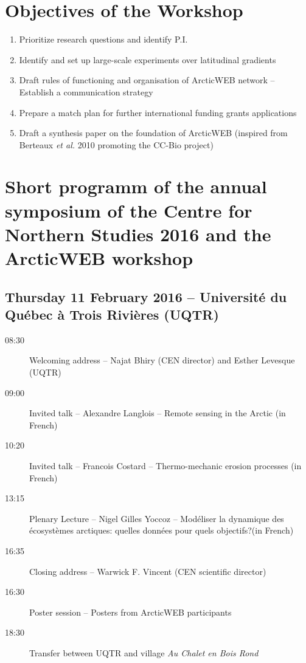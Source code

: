 \documentclass[10pt,letterpaper]{article}
\begin{document}
\section*{Objectives of the Workshop}

\vspace{0.35cm}

\begin{enumerate}
    \item{Prioritize research questions and identify P.I.}
    \item{Identify and set up large-scale experiments over latitudinal gradients}
    \item{Draft rules of functioning and organisation of ArcticWEB network -- Establish a communication strategy}
    \item{Prepare a match plan for further international funding grants applications}
    \item{Draft a synthesis paper on the foundation of ArcticWEB (inspired from Berteaux \textit{et al.} 2010 promoting the CC-Bio project)}
\end{enumerate}

\vspace{0.45cm}

\section*{Short programm of the annual symposium of the Centre for Northern Studies 2016 and the ArcticWEB workshop}

\vspace{0.35cm}

\subsection*{Thursday 11 February 2016 -- Université du Québec à Trois Rivières (UQTR)}

\vspace{0.35cm}

\begin{description}
    \item[08:30] Welcoming address -- Najat Bhiry (CEN director) and Esther Levesque (UQTR)
    \item[09:00] Invited talk -- Alexandre Langlois -- Remote sensing in the Arctic (in French)
    \item[10:20] Invited talk -- Francois Costard -- Thermo-mechanic erosion processes (in French)
    \item[13:15] Plenary Lecture -- Nigel Gilles Yoccoz -- Modéliser la dynamique des écosystèmes arctiques: quelles données pour quels objectifs?(in French)
    \item[16:35] Closing address -- Warwick F. Vincent (CEN scientific director)
    \item[16:30] Poster session -- Posters from ArcticWEB participants
    \item[18:30] Transfer between UQTR and village \textit{Au Chalet en Bois Rond}
\end{description}
\end{document}
